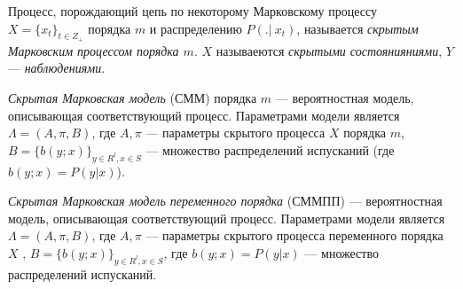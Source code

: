 \documentclass{matmex-diploma-custom}
\begin{document}
\begin{definition}
Процесс, порождающий цепь по некоторому Марковскому процессу $X = \{x_{t}\}_{t \in Z_{+}}$ порядка $m$ и распределению $P(.|~x_{t})$, называется \textit{скрытым Марковским процессом порядка $m$}. 
$ X $ называеются \textit{скрытыми состоянияниями}, $Y$ --- \textit{наблюдениями}.
\end{definition}

\begin{definition}
\textit{Скрытая Марковская модель} (СММ) порядка $ m $ --- вероятностная модель, описывающая соответствующий процесс. Параметрами модели является $\Lambda=(A,\pi,B)$, где $A,\pi$ --- параметры скрытого процесса $X$ порядка $m$,  $ B = \{b(y; x)\}_{y \in R^{l}, x \in S}$ ---  множество распределений испусканий (где $ b(y; x) = P(y|x)$). 
\end{definition}

\begin{definition}
\textit{Скрытая Марковская модель переменного порядка} (СММПП) --- вероятностная модель, описывающая соответствующий процесс. Параметрами модели является $\Lambda=(A,\pi,B)$, где $A,\pi$ --- параметры скрытого процесса переменного порядка $X$ ,  $ B = \{b(y; x)\}_{y \in R^{l}, x \in S}$, где $ b(y; x) = P(y|x)$ ---  множество распределений испусканий. 
\end{definition}
\end{document}
